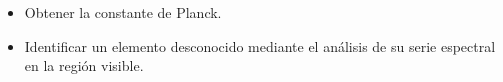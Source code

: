 \begin{itemize}
  \item Obtener la constante de Planck.
  \item Identificar un elemento desconocido mediante el análisis de su serie espectral en la región visible.
\end{itemize}
